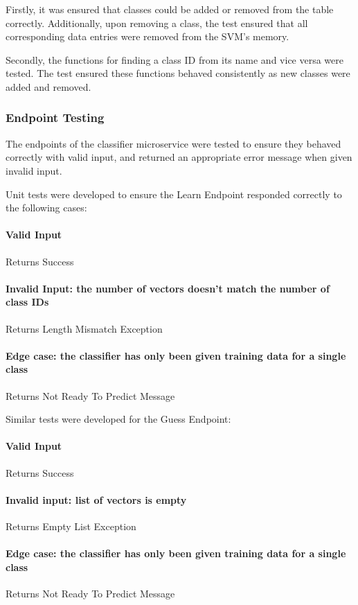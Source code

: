 Firstly, it was ensured that classes could be added or removed from the table correctly. Additionally, upon removing a class, the test ensured that all corresponding data entries were removed from the SVM’s memory. 

Secondly, the functions for finding a class ID from its name and vice versa were tested. The test ensured these functions behaved consistently as new classes were added and removed.
\subsubsection{Endpoint Testing}
The endpoints of the classifier microservice were tested to ensure they behaved correctly with valid input, and returned an appropriate error message when given invalid input.

Unit tests were developed to ensure the Learn Endpoint responded correctly to the following cases:
\paragraph{Valid Input\\}
\tab Returns Success
\paragraph{Invalid Input: the number of vectors doesn’t match the number of class IDs\\}
\tab Returns Length Mismatch Exception
\paragraph{Edge case: the classifier has only been given training data for a single class\\}
\tab Returns Not Ready To Predict Message

Similar tests were developed for the Guess Endpoint:
\paragraph{Valid Input\\}
\tab Returns Success
\paragraph{Invalid input: list of vectors is empty\\}
\tab Returns Empty List Exception
\paragraph{Edge case: the classifier has only been given training data for a single class\\}
\tab Returns Not Ready To Predict Message

